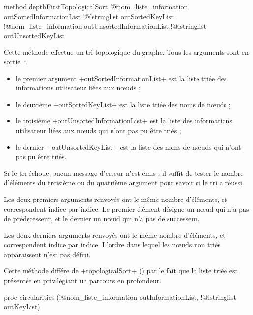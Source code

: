 \begin{galgas4}
method depthFirstTopologicalSort !@nom_liste_information outSortedInformationList
                               !@lstringlist outSortedKeyList
                               !@nom_liste_information outUnsortedInformationList
                               !@lstringlist outUnsortedKeyList
\end{galgas4}

Cette méthode effectue un tri topologique du graphe. Tous les arguments sont en sortie~:
\begin{itemize}
  \item le premier argument \ggsq+outSortedInformationList+ est la liste triée des informations utilisateur liées aux nœuds ;
  \item le deuxième \ggsq+outSortedKeyList+ est la liste triée des noms de nœuds ;
  \item le troisième \ggsq+outUnsortedInformationList+ est la liste des informations utilisateur liées aux nœuds qui n'ont pas pu être triés ;
  \item le dernier \ggsq+outUnsortedKeyList+ est la liste des noms de nœuds qui n'ont pas pu être triés.
\end{itemize}

Si le tri échoue, aucun message d'erreur n'est émis ; il suffit de tester le nombre d'éléments du troisième ou du quatrième argument pour savoir si le tri a réussi.

Les deux premiers arguments renvoyés ont le même nombre d'éléments, et correspondent indice par indice. Le premier élément désigne un nœud qui n'a pas de prédecesseur, et le dernier un nœud qui n'a pas de successeur.


Les deux derniers arguments renvoyés ont le même nombre d'éléments, et correspondent indice par indice. L'ordre dans lequel les nœuds non triés apparaissent n'est pas défini.

Cette méthode différe de \ggsq+topologicalSort+ () par le fait que la liste triée est présentée en privilégiant un parcours en profondeur.







\begin{galgas4}
proc circularities (!@nom_liste_information outInformationList,
                  !@lstringlist outKeyList)
\end{galgas4}

